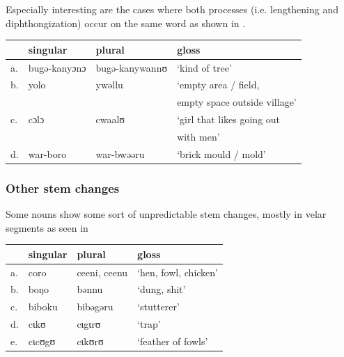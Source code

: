 Especially interesting are the cases where both processes (i.e. lengthening and diphthongization) occur on the same word as shown in .

\begin{exe}
    \ex \label{Ldp-kasem}
    \begin{tabular}[t]{llll}
         & singular     & plural         & gloss                        \\
      \midrule
      a. & bugə-kanyɔnɔ & bugə-kanywannʊ & `kind of tree'               \\
      b. & yolo         & ywəllu         & `empty area / field,         \\
         &              &                & empty space outside village' \\
      c. & cɔlɔ         & cwaalʊ         & `girl that likes going out   \\
         &              &                & with men'                    \\
      d. & war-boro     & war-bwəəru     & `brick mould / mold'         \\
    \end{tabular}
\end{exe}

\subsubsection{Other stem changes}

Some nouns show some sort of unpredictable stem changes, mostly in velar segments as seen in 

\begin{exe}
    \ex \label{other-kasem-1}
    \begin{tabular}[t]{llll}
      & singular & plural       & gloss               \\
      \midrule
      a. & coro     & ceeni, ceenu & `hen, fowl, chicken' \\
      b. & boŋo     & bənnu        & `dung, shit'        \\
      c. & biboku   & bibəgəru     & `stutterer'         \\
      d. & cɩkʊ     & cɩgɩrʊ       & `trap'              \\
      e. & cɩcʊgʊ   & cɩkʊrʊ       & `feather of fowls'  \\
    \end{tabular}
\end{exe}

